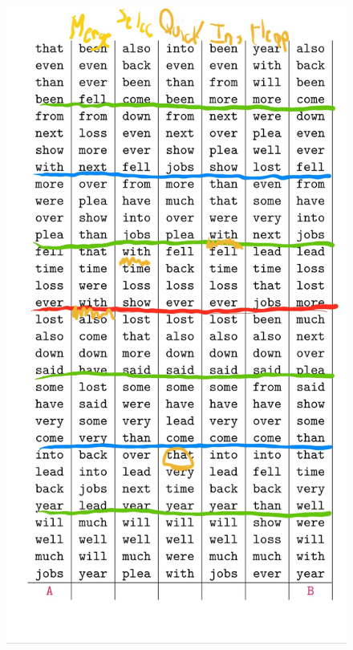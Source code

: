 \documentclass[letterpaper]{article}
\theoremstyle{definition}
\theoremstyle{lemathm}
\theoremstyle{lemademthm}
\begin{document}
\begin{enumerate}
		\begin{figure}[H]
			\centering
			\includegraphics[scale=.06]{Images/Sort.jpg}
		\end{figure}

	\end{enumerate}
	
\end{document}
